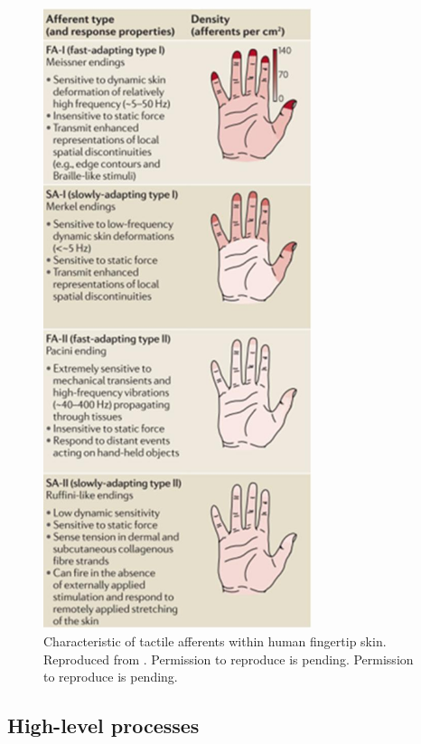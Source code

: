 \begin{figure}[]
	\centering
	\includegraphics[width=0.7\textwidth]{images/tactile_afferents}
	\caption{Characteristic of tactile afferents within human fingertip skin.
Reproduced from \cite{johansson2009coding}. Permission to reproduce is pending. Permission to reproduce is pending.}
	\label{fig:tactile_afferents}
\end{figure}

\subsection{High-level processes}
\label{high_level_processes}

